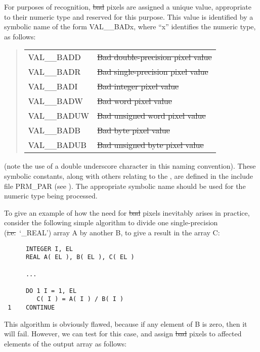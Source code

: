 For purposes of recognition, \st{bad\/} pixels are assigned a unique value,
appropriate to their numeric type and reserved for this purpose. 
This value is identified by a symbolic name of the form VAL\_\_BADx, where
``x'' identifies the numeric type, as follows: 

\small
\begin{quote}
\begin{center}
\begin{tabular}{l@{ --- }l}
VAL\_\_BADD & \st{Bad double-precision pixel value}\\
VAL\_\_BADR & \st{Bad single-precision pixel value}\\
VAL\_\_BADI & \st{Bad integer pixel value}\\
VAL\_\_BADW & \st{Bad word pixel value}\\
VAL\_\_BADUW & \st{Bad unsigned word pixel value}\\
VAL\_\_BADB & \st{Bad byte pixel value}\\
VAL\_\_BADUB & \st{Bad unsigned byte pixel value}
\end{tabular}
\end{center}
\end{quote}
\normalsize

(note the use of a double underscore character in this naming convention).
These symbolic constants, along with others relating to the , are defined
in the include file PRM\_PAR (see ).
The appropriate symbolic name should be used for the numeric type being
processed. 


To give an example of how the need for \st{bad\/} pixels inevitably arises in
practice, consider the following simple algorithm to divide one
single-precision (\st{i.e.}\ `\_REAL') array A by another B, to give a result
in the array C: 

\small
\begin{verbatim}
      INTEGER I, EL
      REAL A( EL ), B( EL ), C( EL )

      ...

      DO 1 I = 1, EL
         C( I ) = A( I ) / B( I )
 1    CONTINUE
\end{verbatim}
\normalsize

This algorithm is obviously flawed, because if any element of B is zero,
then it will fail. 
However, we can test for this case, and assign \st{bad\/} pixels to affected
elements of the output array as follows: 

